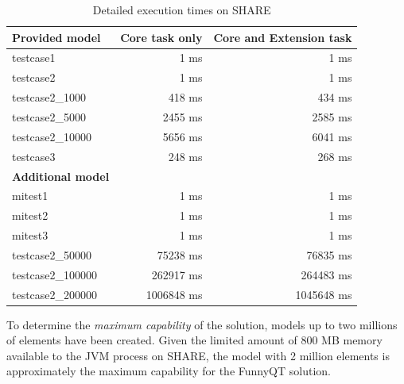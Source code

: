 \documentclass[submission]{eptcs}
\begin{document}
\begin{table}[htb]
  \centering
  \begin{tabular}{| l | r | r |}
    \hline
    \textbf{Provided model}    & \textbf{Core task only} & \textbf{Core and Extension task}\\
    \hline
    \textsf{testcase1}         & 1 ms      & 1 ms\\
    \textsf{testcase2}         & 1 ms      & 1 ms\\
    \textsf{testcase2\_1000}   & 418 ms    & 434 ms\\
    \textsf{testcase2\_5000}   & 2455 ms   & 2585 ms\\
    \textsf{testcase2\_10000}  & 5656 ms   & 6041 ms\\
    \textsf{testcase3}         & 248 ms    & 268 ms\\
    \hline
    \textbf{Additional model}  & & \\
    \hline
    \textsf{mitest1}           & 1 ms      & 1 ms\\
    \textsf{mitest2}           & 1 ms      & 1 ms\\
    \textsf{mitest3}           & 1 ms      & 1 ms\\
    \hline
    \textsf{testcase2\_50000}  & 75238 ms  & 76835 ms\\
    \textsf{testcase2\_100000} & 262917 ms & 264483 ms\\
    \textsf{testcase2\_200000} & 1006848 ms & 1045648 ms\\
    \hline
  \end{tabular}
  \caption{Detailed execution times on SHARE}
  \label{tab:exec-times}
\end{table}

\begin{sloppypar}
  To determine the \emph{maximum capability} of the solution, models up to two
  millions of elements have been created.  Given the limited amount of 800 MB
  memory available to the JVM process on SHARE, the model with 2 million
  elements is approximately the maximum capability for the FunnyQT solution.
\end{sloppypar}

\FloatBarrier



\end{document}
